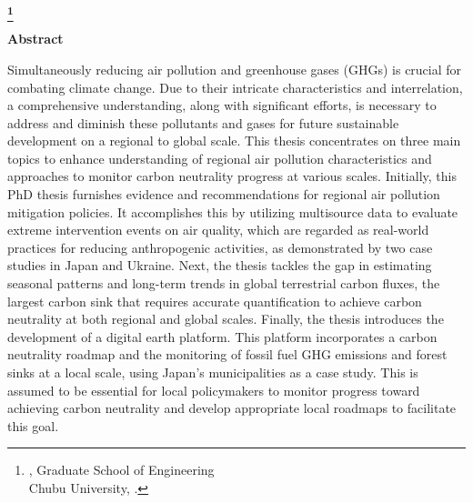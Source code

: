 \begin{center}
 \renewcommand{\thefootnote}{\fnsymbol{footnote}}
 \Large\bfseries \etitle\footnote[1]
 {{\edoctitle}, Graduate School of Engineering\\
 Chubu University, \edate.}
 \renewcommand{\thefootnote}{\arabic{footnote}}
\end{center}
\vspace*{1truemm}
\begin{center}
 \large\eauthor
\end{center}
\vspace*{10truemm}
\begin{center}
 {\bfseries Abstract}
\end{center}
\vspace*{2truemm}
\par

Simultaneously reducing air pollution and greenhouse gases (GHGs) is crucial for combating climate change. Due to their intricate characteristics and interrelation, a comprehensive understanding, along with significant efforts, is necessary to address and diminish these pollutants and gases for future sustainable development on a regional to global scale. This thesis concentrates on three main topics to enhance understanding of regional air pollution characteristics and approaches to monitor carbon neutrality progress at various scales. Initially, this PhD thesis furnishes evidence and recommendations for regional air pollution mitigation policies. It accomplishes this by utilizing multisource data to evaluate extreme intervention events on air quality, which are regarded as real-world practices for reducing anthropogenic activities, as demonstrated by two case studies in Japan and Ukraine. Next, the thesis tackles the gap in estimating seasonal patterns and long-term trends in global terrestrial carbon fluxes, the largest carbon sink that requires accurate quantification to achieve carbon neutrality at both regional and global scales. Finally, the thesis introduces the development of a digital earth platform. This platform incorporates a carbon neutrality roadmap and the monitoring of fossil fuel GHG emissions and forest sinks at a local scale, using Japan's municipalities as a case study. This is assumed to be essential for local policymakers to monitor progress toward achieving carbon neutrality and develop appropriate local roadmaps to facilitate this goal. \par

